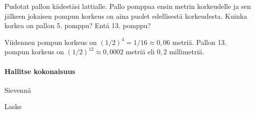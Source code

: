 \begin{tehtavasivu}
    \begin{tehtava}
        Pudotat pallon kädestäsi lattialle. Pallo pomppaa ensin metrin korkeudelle ja sen jälkeen jokaisen pompun korkeus on aina puolet edellisestä korkeudesta. Kuinka korkea on pallon 5. pomppu? Entä 13. pomppu?     
        \begin{vastaus}
        Viidennen pompun korkeus on $(1/2)^4=1/16 \approx 0,06$ metriä. Pallon 13. pompun korkeus on $(1/2)^{12} \approx 0{,}0002$ metriä eli $0,2$ millimetriä.
        \end{vastaus}
\end{tehtava}


\paragraph*{Hallitse kokonaisuus}

\begin{tehtava}
  		Sievennä
        \begin{alakohdatrivi}
 		\end{alakohdatrivi}
        \begin{vastaus}
        \begin{alakohdatrivi}
        \end{alakohdatrivi}
        \end{vastaus}
\end{tehtava}

\begin{tehtava}
  		Laske
        \begin{alakohdatrivi}
 		\end{alakohdatrivi}
        \begin{vastaus}
        \begin{alakohdatrivi}
        \end{alakohdatrivi}
        \end{vastaus}
\end{tehtava}


\end{tehtavasivu}
